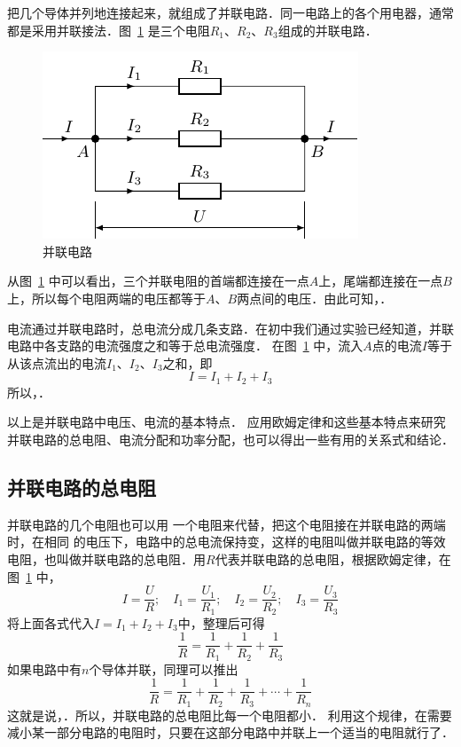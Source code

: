 把几个导体并列地连接起来，就组成了并联电路．同一电路上的各个用电器，通常都是采用并联接法．图~\ref{fig_B_7-11} 是三个电阻$R_1$、$R_2$、$R_3$组成的并联电路．

\begin{figure}[htbp]
	\centering
	\includegraphics{fig/B/7-11.pdf}
	\caption{并联电路}\label{fig_B_7-11}
\end{figure}


从图~\ref{fig_B_7-11} 中可以看出，三个并联电阻的首端都连接在一点$A$上，尾端都连接在一点$B$上，所以每个电阻两端的电压都等于$A$、$B$两点间的电压．由此可知，．

电流通过并联电路时，总电流分成几条支路．在初中我们通过实验已经知道，并联电路中各支路的电流强度之和等于总电流强度．
在图~\ref{fig_B_7-11} 中，流入$A$点的电流$I$等于从该点流出的电流$I_1$、$I_2$、$I_3$之和，即
\[I=I_1+I_2+I_3\]
所以，．


以上是并联电路中电压、电流的基本特点．
应用欧姆定律和这些基本特点来研究并联电路的总电阻、电流分配和功率分配，也可以得出一些有用的关系式和结论．

\subsection{并联电路的总电阻}
并联电路的几个电阻也可以用
一个电阻来代替，把这个电阻接在并联电路的两端时，在相同
的电压下，电路中的总电流保持变，这样的电阻叫做并联电路的等效电阻，也叫做并联电路的总电阻．用$R$代表并联电路的总电阻，根据欧姆定律，在图~\ref{fig_B_7-11} 中，
\[I=\frac{U}{R};\quad I_1=\frac{U_1}{R_1};\quad I_2=\frac{U_2}{R_2};\quad I_3=\frac{U_3}{R_3}\]
将上面各式代入$I=I_1+I_2+I_3$中，整理后可得
\[\frac{1}{R}=\frac{1}{R_1}+\frac{1}{R_2}+\frac{1}{R_3} \]
如果电路中有$n$个导体并联，同理可以推出
\[\frac{1}{R}=\frac{1}{R_1}+\frac{1}{R_2}+\frac{1}{R_3}+\cdots+\frac{1}{R_n} \]
这就是说，．所以，并联电路的总电阻比每一个电阻都小．
利用这个规律，在需要减小某一部分电路的电阻时，只要在这部分电路中并联上一个适当的电阻就行了．


